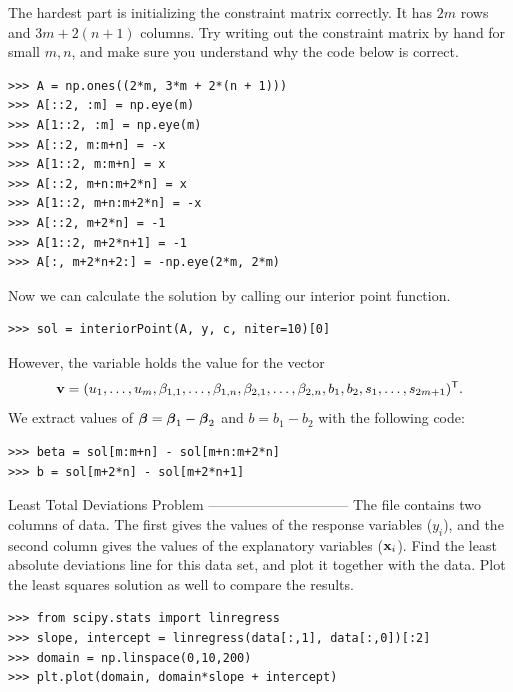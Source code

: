 The hardest part is initializing the constraint matrix correctly.
It has $2m$ rows and $3m + 2(n+1)$ columns.
Try writing out the constraint matrix by hand for small $m, n$, and make sure you understand why the code below is correct.
\begin{lstlisting}
>>> A = np.ones((2*m, 3*m + 2*(n + 1)))
>>> A[::2, :m] = np.eye(m)
>>> A[1::2, :m] = np.eye(m)
>>> A[::2, m:m+n] = -x
>>> A[1::2, m:m+n] = x
>>> A[::2, m+n:m+2*n] = x
>>> A[1::2, m+n:m+2*n] = -x
>>> A[::2, m+2*n] = -1
>>> A[1::2, m+2*n+1] = -1
>>> A[:, m+2*n+2:] = -np.eye(2*m, 2*m)
\end{lstlisting}

Now we can calculate the solution by calling our interior point function.
\begin{lstlisting}
>>> sol = interiorPoint(A, y, c, niter=10)[0]
\end{lstlisting}

However, the variable  holds the value for the vector
\[
\mathbf{v} = (u_1,\ldots, u_m, \beta_{1,1},\ldots, \beta_{1,n}, \beta_{2,1},\ldots, \beta_{2,n}, b_1, b_2, s_1,\ldots,s_{2m+1})^{\mathsf T} .
\]
We extract values of $\boldsymbol{\beta} = \boldsymbol{\beta}_1-\boldsymbol{\beta}_2$ and $b = b_1 - b_2$ with the following code:
\begin{lstlisting}
>>> beta = sol[m:m+n] - sol[m+n:m+2*n]
>>> b = sol[m+2*n] - sol[m+2*n+1]
\end{lstlisting}

\begin{problem}{Least Total Deviations Problem}{} ------------------------------
The file  contains two columns of data.
The first gives the values of the response variables ($y_i$), and the second column gives the values of the explanatory variables ($\mathbf{x}_i$).
Find the least absolute deviations line for this data set, and plot it together with the data.
Plot the least squares solution as well to compare the results.
\begin{lstlisting}
>>> from scipy.stats import linregress
>>> slope, intercept = linregress(data[:,1], data[:,0])[:2]
>>> domain = np.linspace(0,10,200)
>>> plt.plot(domain, domain*slope + intercept)
\end{lstlisting}
\end{problem}
